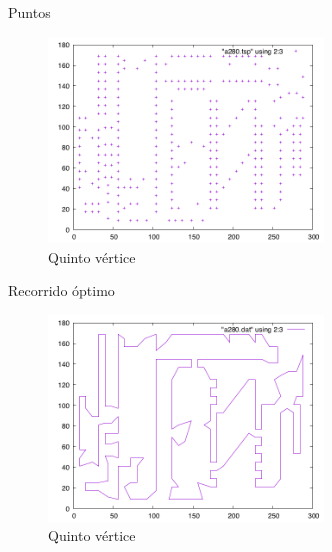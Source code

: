 \begin{frame}
	\begin{exampleblock}{Puntos}
	\begin{figure}[htbH]
		\centering
		\includegraphics[width=0.65\textwidth]{../Viajante/Imagenes/a280.png}
		\caption{Quinto vértice}
	\end{figure}
	\end{exampleblock}
\end{frame}

\begin{frame}
	\begin{exampleblock}{Recorrido óptimo}
	\begin{figure}[htbH]
		\centering
		\includegraphics[width=0.65\textwidth]{../Viajante/Imagenes/a280_opt.png}
		\caption{Quinto vértice}
	\end{figure}
	\end{exampleblock}
\end{frame}














